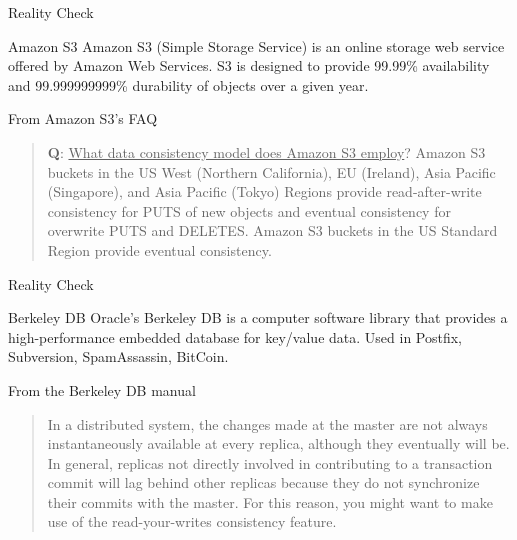 \begin{frame}{Reality Check}

\begin{block}{Amazon S3}
Amazon S3 (Simple Storage Service) is an online storage web service offered by Amazon Web Services.
S3 is designed to provide   99.99\% availability and 99.999999999\% durability of objects over a given year.
\end{block}

\smallskip
\begin{block}{From Amazon S3's FAQ}
\begin{quote}
\textbf{Q}: \underline{What data consistency model does Amazon S3 employ}?
Amazon S3 buckets in the US West (Northern California), EU (Ireland), Asia
Pacific (Singapore), and Asia Pacific (Tokyo) Regions provide
\alert{read-after-write} consistency for PUTS of new objects and
\alert{eventual consistency} for overwrite PUTS and DELETES. Amazon S3 buckets
in the US Standard Region provide \alert{eventual
consistency}.
\end{quote}
\end{block}

\end{frame}

\begin{frame}{Reality Check}

\begin{block}{Berkeley DB}
Oracle's Berkeley DB is a computer software library that provides a 
high-performance embedded database for key/value data. Used in Postfix,
Subversion, SpamAssassin, BitCoin.
\end{block}

\smallskip
\begin{block}{From the Berkeley DB manual}
\begin{quote}
In a distributed system, the changes made at the master are not always
instantaneously available at every replica, although they \alert{eventually}
will be. In general, replicas not directly involved in contributing to a
transaction commit will lag behind other replicas because they do not
synchronize their commits with the master. For this reason, you might want to
make use of the \alert{read-your-writes} consistency feature.
\end{quote}
\end{block}

\end{frame}

